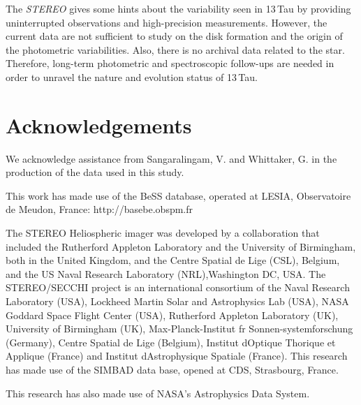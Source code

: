 \documentclass[]{article}
\begin{document}
The {\sl STEREO} gives some hints about the variability seen in 13\,Tau by providing uninterrupted observations and high-precision measurements. However, the current data are not sufficient to study on the disk formation and the origin of the photometric variabilities. Also, there is no archival data related to the star. Therefore, long-term photometric and spectroscopic follow-ups are needed in order to unravel the nature and evolution status of 13\,Tau.



\section*{Acknowledgements}

We acknowledge assistance from Sangaralingam, V. and Whittaker, G. in the production of the data used in this study.

This work has made use of the BeSS database, operated at LESIA,
Observatoire de Meudon, France: http://basebe.obspm.fr

The STEREO Heliospheric imager was developed by a collaboration that
included the Rutherford Appleton Laboratory and the University of
Birmingham, both in the United Kingdom, and the Centre Spatial
de Lige (CSL), Belgium, and the US Naval Research Laboratory
(NRL),Washington DC, USA. The STEREO/SECCHI project is an
international consortium of the Naval Research Laboratory (USA),
Lockheed Martin Solar and Astrophysics Lab (USA), NASA Goddard 
Space Flight Center (USA), Rutherford Appleton Laboratory (UK), University of Birmingham (UK), Max-Planck-Institut fr
Sonnen-systemforschung (Germany), Centre Spatial de Lige (Belgium), Institut dOptique Thorique et Applique (France) and Institut dAstrophysique Spatiale (France). This research has made use of
the SIMBAD data base, opened at CDS, Strasbourg, France. 

This research has also made use of NASA's Astrophysics Data System. 
\end{document}
